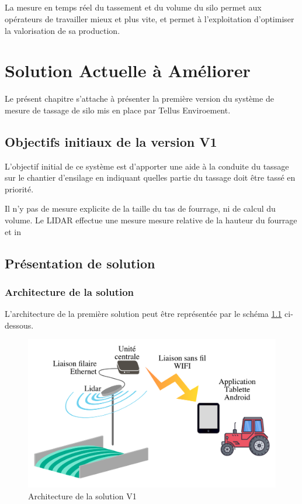 \documentclass[12pt,a4paper]{report}
\begin{document}
\paragraph{} La mesure en temps réel du tassement et du volume du silo permet aux opérateurs de travailler mieux et plus vite, et permet à l'exploitation d'optimiser la valorisation de sa production.

\chapter{Solution Actuelle à Améliorer}
Le présent chapitre s'attache à présenter la première version du système de mesure de tassage de silo mis en place par Tellus Enviroement.
\section{Objectifs initiaux de la version V1}
L'objectif initial de ce système est d'apporter une aide à la conduite du tassage sur le chantier d'ensilage en indiquant quelles partie du tassage doit être tassé en priorité.
\newline

Il n'y pas de mesure explicite de la taille du tas de fourrage, ni de calcul du volume. Le LIDAR effectue une mesure mesure relative de la hauteur du fourrage et in

\section{Présentation de solution}
\subsection{Architecture de la solution}

L'architecture de la première solution peut être représentée par le schéma \ref{fig:archigenv1} ci-dessous.

\begin{figure}[H]
	\centering
	\includegraphics[width=0.7\linewidth]{img/ArchiGenV1}
	\caption{Architecture de la solution V1}
	\label{fig:archigenv1}
\end{figure}
\end{document}
